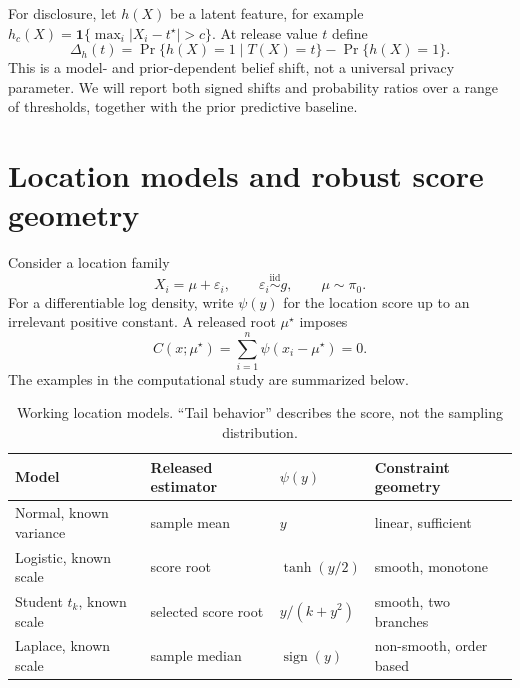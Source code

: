 \documentclass[smallextended,natbib,runningheads]{svjour3}
\begin{document}
For disclosure, let $h(X)$ be a latent feature, for example
$h_c(X)=\mathbf 1\{\max_i|X_i-t^\star|>c\}$.  At release value $t$ define
\begin{equation}
 \Delta_h(t)=
 \Pr\{h(X)=1\mid T(X)=t\}-\Pr\{h(X)=1\}.
 \label{eq:privacy_shift}
\end{equation}
This is a model- and prior-dependent belief shift, not a universal privacy
parameter.  We will report both signed shifts and probability ratios over a
range of thresholds, together with the prior predictive baseline.

\section{Location models and robust score geometry}
\label{sec:models}

Consider a location family
\[
  X_i=\mu+\varepsilon_i,\qquad \varepsilon_i\overset{\mathrm{iid}}\sim g,
  \qquad \mu\sim\pi_0.
\]
For a differentiable log density, write $\psi(y)$ for the location score up to
an irrelevant positive constant.  A released root $\mu^\star$ imposes
\begin{equation}
 C(x;\mu^\star)=\sum_{i=1}^n\psi(x_i-\mu^\star)=0.
 \label{eq:location_constraint}
\end{equation}
The examples in the computational study are summarized below.

\begin{table}[t]
\centering
\caption{Working location models.  ``Tail behavior'' describes the score, not
the sampling distribution.}
\label{tab:models}
\small
\begin{tabular}{p{}p{}p{}p{}}
\toprule
Model & Released estimator & $\psi(y)$ & Constraint geometry \\
\midrule
Normal, known variance & sample mean & $y$ & linear, sufficient \\
Logistic, known scale & score root & $\tanh(y/2)$ & smooth, monotone \\
Student $t_k$, known scale & selected score root & $y/(k+y^2)$
  & smooth, two branches \\
Laplace, known scale & sample median & $\operatorname{sign}(y)$
  & non-smooth, order based \\
\bottomrule
\end{tabular}
\end{table}
\end{document}
